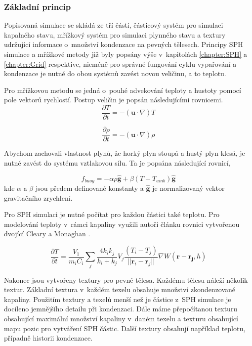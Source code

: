 \subsubsection{Základní princip}
Popisovaná simulace se skládá ze tří částí, částicový systém pro simulaci kapalného stavu, mřížkový systém pro simulaci plynného stavu a textury udržující informace o~množství kondenzace na pevných tělesech. Principy SPH simulace a mřížkové metody již byly popsány výše v~kapitolách \ref{chapter:SPH} a \ref{chapter:Grid} respektive, nicméně pro správné fungování cyklu vypařování a kondenzace je nutné do obou systémů zavést novou veličinu, a to teplotu. 

Pro mřížkovou metodu se jedná o~pouhé advekování teploty a hustoty pomocí pole vektorů rychlostí. Postup veličin je popsán následujícími rovnicemi.
\begin{equation}
    \frac{\partial T}{\partial t} = -(\mathbf{u} \cdot \nabla)T
\end{equation}

\begin{equation}
    \frac{\partial \rho}{\partial t} = -(\mathbf{u} \cdot \nabla)\rho
\end{equation}

Abychom zachovali vlastnost plynů, že horký plyn stoupá a hustý plyn klesá, je nutné zavést do systému vztlakovou sílu. Ta je popsána následující rovnicí,

\begin{equation}
    f_{buoy} = -\alpha \rho \hat{\mathbf{g}} + \beta(T - T_{amb})\hat{\mathbf{g}}
\end{equation}
kde $\alpha$ a $\beta$ jsou předem definované konstanty a $\hat{\mathbf{g}}$ je normalizovaný vektor gravitačního zrychlení.

Pro SPH simulaci je nutné počítat pro každou částici také teplotu. Pro modelování teploty v~rámci kapaliny využili autoři článku rovnici vytvořenou dvojící Cleary a Monaghan \cite{Cleary99}.

\begin{equation}
    \frac{\partial T}{\partial t} = \frac{V_1}{m_i C_i} \sum_j \frac{4 k_i k_j}{k_i + k_j} V_j \frac{(T_i - T_j)}{||\mathbf{r}_i - \mathbf{r}_j||}\nabla W(\mathbf{r} - \mathbf{r_j},h)
\end{equation}

Nakonec jsou vytvořeny textury pro pevné tělesa. Každému tělesu náleží několik textur. Základní textura v~každém texelu obsahuje množství zkondenzované kapaliny. Použitím textury a texelů menší než je částice z~SPH simulace je docíleno jemnějšího detailu při kondenzaci. Dále máme přepočítanou texturu obsahující maximální množství kapaliny v~daném texelu a texturu obsahující mapu pozic pro vytváření SPH částic. Další textury obsahují například teplotu, případně historii kondenzace.

